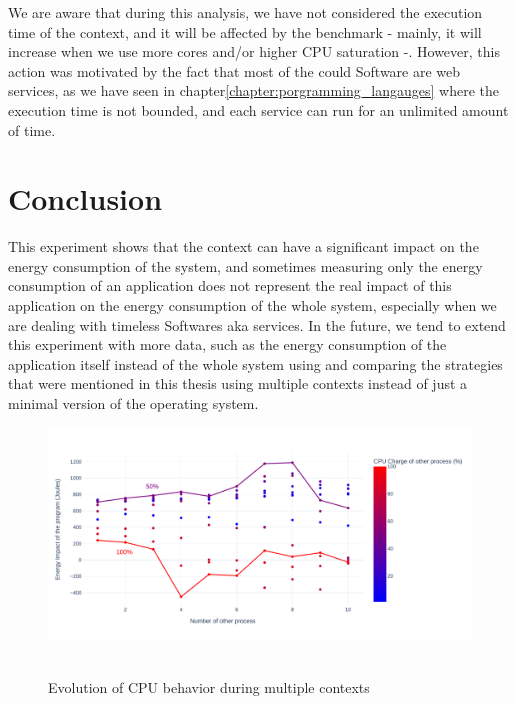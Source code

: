 We are aware that during this analysis, we have not considered the execution time of the context, and it will be affected by the benchmark - mainly, it will increase when we use more cores and/or higher CPU saturation -. However, this action was motivated by the fact that most of the could Software are web services, as we have seen in chapter\ref{chapter:porgramming_langauges} where the execution time is not bounded, and each service can run for an unlimited amount of time.

\section{Conclusion}
This experiment shows that the context can have a significant impact on the energy consumption of the system, and sometimes measuring only the energy consumption of an application does not represent the real impact of this application on the energy consumption of the whole system, especially when we are dealing with timeless Softwares aka services. 
In the future, we tend to extend this experiment with more data, such as the energy consumption of the application itself instead of the whole system using \cite{fieni2020smartwatts} and comparing the strategies that were mentioned in this thesis using multiple contexts instead of just a minimal version of the operating system.





\begin{figure}[!t]
      \centering
      \caption{Evolution of CPU behavior during multiple contexts }
      \includegraphics[width=\linewidth]{chapters/green_faas_impact}\
      \label{fig:green_faas_impact}
\end{figure}







\vfill \strut  %
\cleardoublepage
